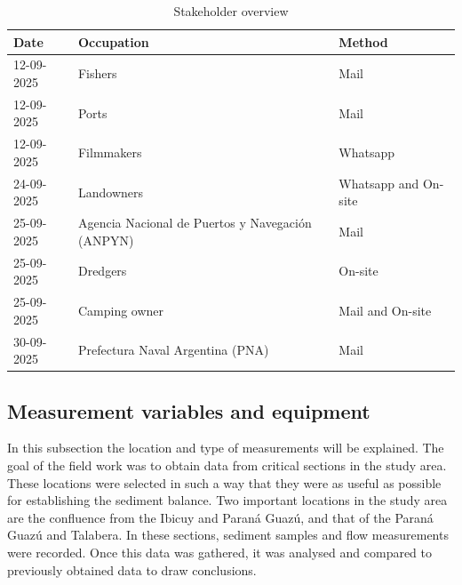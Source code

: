 \begin{table}[H]
    \centering
    \begin{tabularx}{\textwidth}{l l l}
        \toprule
        Date & Occupation & Method \\
        \midrule
        12-09-2025 & Fishers & Mail \\
        12-09-2025 & Ports & Mail \\
        12-09-2025 & Filmmakers & Whatsapp \\
        24-09-2025 & Landowners & Whatsapp and On-site \\
        25-09-2025 & Agencia Nacional de Puertos y Navegación (ANPYN) &  Mail \\
        25-09-2025 & Dredgers & On-site \\
        25-09-2025 & Camping owner & Mail and On-site \\
        30-09-2025 & Prefectura Naval Argentina (PNA) & Mail \\
        \bottomrule
    \end{tabularx}
    \caption{Stakeholder overview}
    \label{tab:stakeholders}
\end{table}


\subsection{Measurement variables and equipment}
\label{Measurement variables and equipment}
In this subsection the location and type of measurements will be explained. The goal of the field work was to obtain data from critical sections in the study area. These locations were selected in such a way that they were as useful as possible for establishing the sediment balance. Two important locations in the study area are the confluence from the Ibicuy and Paraná Guazú, and that of the Paraná Guazú and Talabera. In these sections, sediment samples and flow measurements were recorded.
Once this data was gathered, it was analysed and compared to previously obtained data to draw conclusions. 



